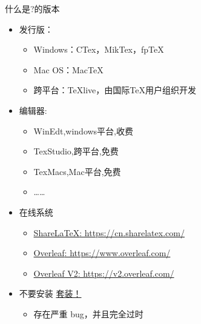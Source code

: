 \documentclass[fontset = adobe, xcolor=svgnames, t, aspectratio=169]{ctexbeamer}
\begin{document}
\begin{frame}[t]{什么是\latex?}{\latex 的版本}
  \stretchon
  \begin{itemize}
  \item 发行版：
    \begin{itemize}    
    \item Windows：CTex，MikTex，fpTeX
    \item Mac OS：MacTeX        
    \item 跨平台：\alert{TeXlive}，由国际{\TeX}用户组织开发
    \end{itemize}
  \item 编辑器:
    \begin{itemize}
    \item WinEdt,windows平台,收费
    \item \alert{TexStudio},跨平台,免费
    \item TexMacs,Mac平台,免费
    \item \ldots\ldots
    \end{itemize}
  \item 在线系统
    \begin{itemize}
    \item
      \href{https://cn.sharelatex.com/}{\alert{ShareLaTeX}: 
        https://cn.sharelatex.com/}%
    \item
      \href{https://www.overleaf.com/}{\alert{Overleaf}: 
        https://www.overleaf.com/}
    \item
      \href{https://v2.overleaf.com/}{\alert{Overleaf V2}: 
        https://v2.overleaf.com/}  
    \end{itemize}
  \item \alert{不要安装 \href{http://www.ctex.org/HomePage}{\CTeX{} 套装！}}
    \begin{itemize}
      \item \alert{存在严重 bug，并且完全过时}
    \end{itemize}
  \end{itemize}
  \stretchoff
\end{frame}
\end{document}
